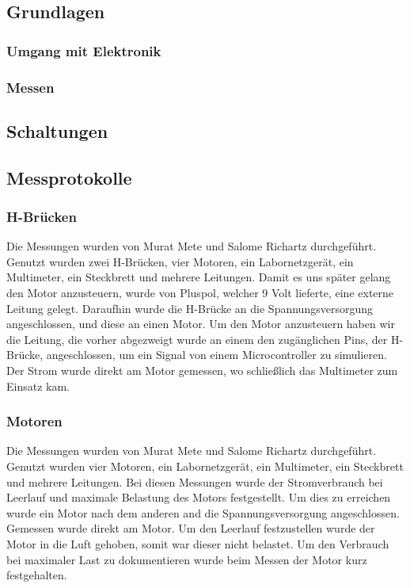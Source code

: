 \documentclass{report}
\begin{document}
\subsection{Grundlagen}

\subsubsection{Umgang mit Elektronik}

\subsubsection{Messen}

\subsection{Schaltungen}

\subsection{Messprotokolle}

\subsubsection{H-Br\"{u}cken}
Die Messungen wurden von Murat Mete und Salome Richartz durchgef\"{u}hrt. Genutzt wurden zwei H-Br\"{u}cken, vier Motoren, ein Labornetzger\"{a}t, ein Multimeter, ein Steckbrett und mehrere Leitungen. Damit es uns sp\"{a}ter gelang den Motor anzusteuern, wurde von Pluspol, welcher 9 Volt lieferte, eine externe Leitung gelegt. Daraufhin wurde die H-Br\"{u}cke an die Spannungsversorgung angeschlossen, und diese an einen Motor. Um den Motor anzusteuern haben wir die Leitung, die vorher abgezweigt wurde an einem den zug\"{a}nglichen Pins, der H-Br\"{u}cke, angeschlossen, um ein Signal von einem Microcontroller zu simulieren. Der Strom wurde direkt am Motor gemessen, wo schlie{\ss}lich das Multimeter zum Einsatz kam.

\subsubsection{Motoren}

Die Messungen wurden von Murat Mete und Salome Richartz durchgef\"{u}hrt. Genutzt wurden vier Motoren, ein Labornetzger\"{a}t, ein Multimeter, ein Steckbrett und mehrere Leitungen. Bei diesen Messungen wurde der Stromverbrauch bei Leerlauf und maximale Belastung des Motors festgestellt. Um dies zu erreichen wurde ein Motor nach dem anderen and die Spannungsversorgung angeschlossen. Gemessen wurde direkt am Motor. Um den Leerlauf festzustellen wurde der Motor in die Luft gehoben, somit war dieser nicht belastet. Um den Verbrauch bei maximaler Last zu dokumentieren wurde beim Messen der Motor kurz festgehalten.
\end{document}
